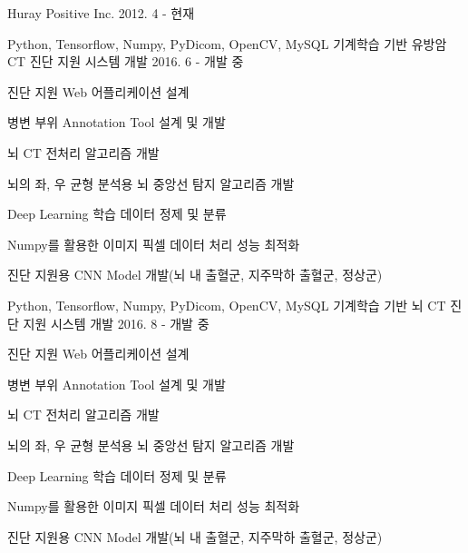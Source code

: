 \begin{cvskills}
  \cvskill
    {Huray Positive Inc.} 
    {2012. 4 - 현재} 
\end{cvskills}

\begin{cvexpentries}
  \cvexpentry
    {Python, Tensorflow, Numpy, PyDicom, OpenCV, MySQL}
    {기계학습 기반 유방암 CT 진단 지원 시스템 개발}
    {2016. 6 - 개발 중}
    {}
    {
        \begin{cvitems}
            \item {진단 지원 Web 어플리케이션 설계}
            \item {병변 부위 Annotation Tool 설계 및 개발}
            \item {뇌 CT 전처리 알고리즘 개발}
            \item {뇌의 좌, 우 균형 분석용 뇌 중앙선 탐지 알고리즘 개발}
            \item {Deep Learning 학습 데이터 정제 및 분류}
            \item {Numpy를 활용한 이미지 픽셀 데이터 처리 성능 최적화}
            \item {진단 지원용 CNN Model 개발(뇌 내 출혈군, 지주막하 출혈군, 정상군)}
        \end{cvitems}
    }
\end{cvexpentries}

\begin{cvexpentries}
  \cvexpentry
    {Python, Tensorflow, Numpy, PyDicom, OpenCV, MySQL}
    {기계학습 기반 뇌 CT 진단 지원 시스템 개발}
    {2016. 8 - 개발 중}
    {}
    {
        \begin{cvitems}
            \item {진단 지원 Web 어플리케이션 설계}
            \item {병변 부위 Annotation Tool 설계 및 개발}
            \item {뇌 CT 전처리 알고리즘 개발}
            \item {뇌의 좌, 우 균형 분석용 뇌 중앙선 탐지 알고리즘 개발}
            \item {Deep Learning 학습 데이터 정제 및 분류}
            \item {Numpy를 활용한 이미지 픽셀 데이터 처리 성능 최적화}
            \item {진단 지원용 CNN Model 개발(뇌 내 출혈군, 지주막하 출혈군, 정상군)}
        \end{cvitems}
    }
\end{cvexpentries}

